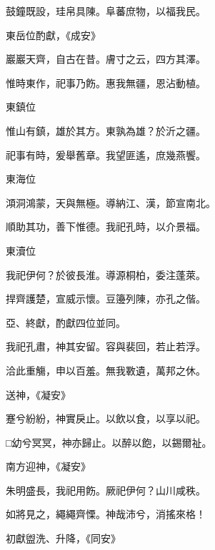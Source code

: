 \begin{pinyinscope}
 鼓鐘既設，珪帛具陳。阜蕃庶物，以福我民。



 東岳位酌獻，《成安》



 巖巖天齊，自古在昔。膚寸之云，四方其澤。



 惟時東作，祀事乃飭。惠我無疆，恩沾動植。



 東鎮位



 惟山有鎮，雄於其方。東孰為雄？於沂之疆。



 祀事有時，爰舉舊章。我望匪遙，庶幾燕饗。



 東海位



 澒洞鴻蒙，天與無極。導納江、漢，節宣南北。



 順助其功，善下惟德。我祀孔時，以介景福。



 東瀆位



 我祀伊何？於彼長淮。導源桐柏，委注蓬萊。



 捍齊護楚，宣威示懷。豆籩列陳，亦孔之偕。



 亞、終獻，酌獻四位並同。



 我祀孔肅，神其安留。容與裴回，若止若浮。



 洽此重觴，申以百羞。無我斁遺，萬邦之休。



 送神，《凝安》



 蹇兮紛紛，神實戾止。以飲以食，以享以祀。



 □幼兮冥冥，神亦歸止。以醉以飽，以錫爾祉。



 南方迎神，《凝安》



 朱明盛長，我祀用飭。厥祀伊何？山川咸秩。



 如將見之，繩繩齊慄。神哉沛兮，消搖來格！



 初獻盥洗、升降，《同安》




\end{pinyinscope}
